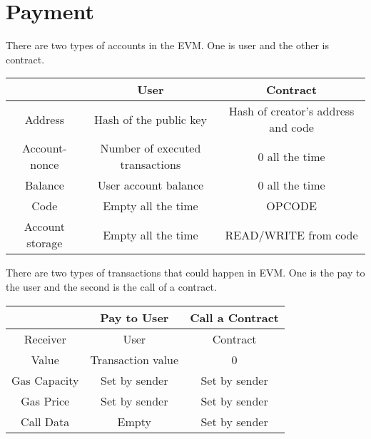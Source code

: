 \documentclass{article}
\begin{document}
\section*{Payment}
There are two types of accounts in the EVM. One is user and the other is contract.
\begin{center}
\begin{tabular}{| c | c | c |}
\hline
  & User & Contract \\ 
  \hline
 Address & Hash of the public key & Hash of creator’s address and code \\ 
 \hline
 Account-nonce & Number of executed transactions & 0 all the time   \\
 \hline
 Balance & User account balance & 0 all the time   \\
 \hline
 Code & Empty all the time & OPCODE   \\
 \hline
 Account storage & Empty all the time & READ/WRITE from code   \\
 \hline
\end{tabular}
\end{center}
There are two types of transactions that could happen in EVM. One is the pay to the user and the second is the call of a contract.
\begin{center}
\begin{tabular}{| c | c | c |}
\hline
  & Pay to User & Call a Contract \\ 
  \hline
 Receiver & User & Contract \\ 
 \hline
 Value & Transaction value & 0    \\
 \hline
 Gas Capacity & Set by sender & Set by sender   \\
 \hline
 Gas Price & Set by sender & Set by sender   \\
 \hline
 Call Data & Empty & Set by sender   \\
 \hline
\end{tabular}
\end{center}
\end{document}
